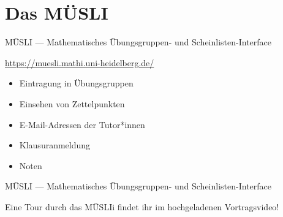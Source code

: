 \section{Das MÜSLI}
\begin{frame}{MÜSLI --- \normalsize Mathematisches Übungsgruppen- und Scheinlisten-Interface}

    \large \url{https://muesli.mathi.uni-heidelberg.de/}

    \begin{minipage}[t]{0.7\textwidth}

    \begin{itemize}
        \item Eintragung in Übungsgruppen
        \item Einsehen von Zettelpunkten
        \item E-Mail-Adressen der Tutor*innen
        \item Klausuranmeldung
        \item Noten
    \end{itemize}
    \end{minipage}
    \begin{minipage}[t]{0.28\textwidth}
        \vspace*{0em}
        \begin{center}
        \end{center}
    \end{minipage}
\end{frame}

\begin{frame}{MÜSLI --- \normalsize Mathematisches Übungsgruppen- und Scheinlisten-Interface}
    \vspace{6em}
    \begin{center}
        \Large Eine Tour durch das MÜSLIi findet ihr im hochgeladenen Vortragsvideo!
    \end{center}
\end{frame}



